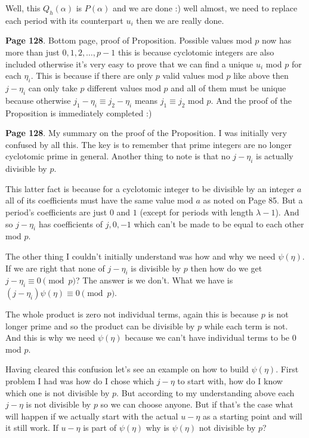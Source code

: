 \documentclass[aps,preprint,preprintnumbers,nofootinbib,showpacs,prd]{revtex4-1}
\begin{document}
Well, this $Q_h(\alpha)$ is $P(\alpha)$ and we are done :) well almost, we need to replace each period with its counterpart $u_i$ then we are really done.







{\bf Page 128}. Bottom page, proof of Proposition. Possible values mod $p$ now has more than just $0,1,2,\dots, p-1$ this is because cyclotomic integers are also included otherwise it's very easy to prove that we can find a unique $u_i$ mod $p$ for each $\eta_i$. This is because if there are only $p$ valid values mod $p$ like above then $j - \eta_i$ can only take $p$ different values mod $p$ and all of them must be unique because otherwise $j_1 -\eta_i \equiv j_2 -\eta_i$ means $j_1 \equiv j_2$ mod $p$. And the proof of the Proposition is immediately completed :)

{\bf Page 128}. My summary on the proof of the Proposition. I was initially very confused by all this. The key is to remember that prime integers are no longer cyclotomic prime in general. Another thing to note is that no $j - \eta_i$ is actually divisible by $p$.

This latter fact is because for a cyclotomic integer to be divisible by an integer $a$ all of its coefficients must have the same value mod $a$ as noted on Page 85. But a period's coefficients are just $0$ and $1$ (except for periods with length $\lambda - 1$). And so $j - \eta_i$ has coefficients of $j ,0,-1$ which can't be made to be equal to each other mod $p$.

The other thing I couldn't initially understand was how and why we need $\psi(\eta)$. If we are right that none of $j - \eta_i$ is divisible by $p$ then how do we get $j - \eta_i \equiv 0 \pmod{p}$? The answer is we don't. What we have is $(j - \eta_i)\psi(\eta) \equiv 0 \pmod{p}$. 

The whole product is zero not individual terms, again this is because $p$ is not longer prime and so the product can be divisible by $p$ while each term is not. And this is why we need $\psi(\eta)$ because we can't have individual terms to be 0 mod $p$.

Having cleared this confusion let's see an example on how to build $\psi(\eta)$. First problem I had was how do I chose which $j - \eta$ to start with, how do I know which one is not divisible by $p$. But according to my understanding above each $j - \eta$ is not divisible by $p$ so we can choose anyone. But if that's the case what will happen if we actually start with the actual $u - \eta$ as a starting point and will it still work. If $u - \eta$ is part of $\psi(\eta)$ why is $\psi(\eta)$ not divisible by $p$? 
\end{document}
